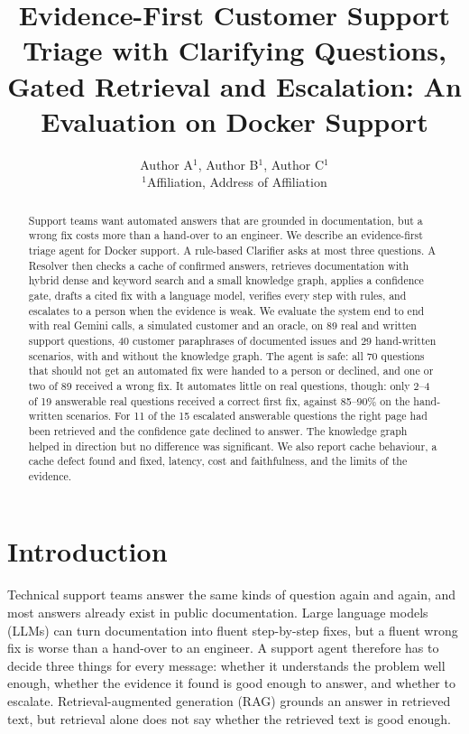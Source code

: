 \documentclass[cameraready]{ieeeconf}
\title{Evidence-First Customer Support Triage with Clarifying Questions, Gated Retrieval and Escalation: An Evaluation on Docker Support}
\author{Author A$^{1}$, Author B$^{1}$, Author C$^{1}$ \\
$^{1}$Affiliation, Address of Affiliation}
\begin{document}
\maketitle

\begin{abstract}
Support teams want automated answers that are grounded in documentation, but a wrong fix costs more than a hand-over to an engineer.
We describe an evidence-first triage agent for Docker support. A rule-based Clarifier asks at most three questions. A Resolver then checks a cache of confirmed answers, retrieves documentation with hybrid dense and keyword search and a small knowledge graph, applies a confidence gate, drafts a cited fix with a language model, verifies every step with rules, and escalates to a person when the evidence is weak.
We evaluate the system end to end with real Gemini calls, a simulated customer and an oracle, on 89 real and written support questions, 40 customer paraphrases of documented issues and 29 hand-written scenarios, with and without the knowledge graph.
The agent is safe: all 70 questions that should not get an automated fix were handed to a person or declined, and one or two of 89 received a wrong fix. It automates little on real questions, though: only 2--4 of 19 answerable real questions received a correct first fix, against 85--90\% on the hand-written scenarios. For 11 of the 15 escalated answerable questions the right page had been retrieved and the confidence gate declined to answer. The knowledge graph helped in direction but no difference was significant. We also report cache behaviour, a cache defect found and fixed, latency, cost and faithfulness, and the limits of the evidence.
\end{abstract}

\section{Introduction}
Technical support teams answer the same kinds of question again and again, and most answers already exist in public documentation. Large language models (LLMs) can turn documentation into fluent step-by-step fixes, but a fluent wrong fix is worse than a hand-over to an engineer. A support agent therefore has to decide three things for every message: whether it understands the problem well enough, whether the evidence it found is good enough to answer, and whether to escalate. Retrieval-augmented generation (RAG) \cite{lewis2020rag} grounds an answer in retrieved text, but retrieval alone does not say whether the retrieved text is good enough.
\end{document}
